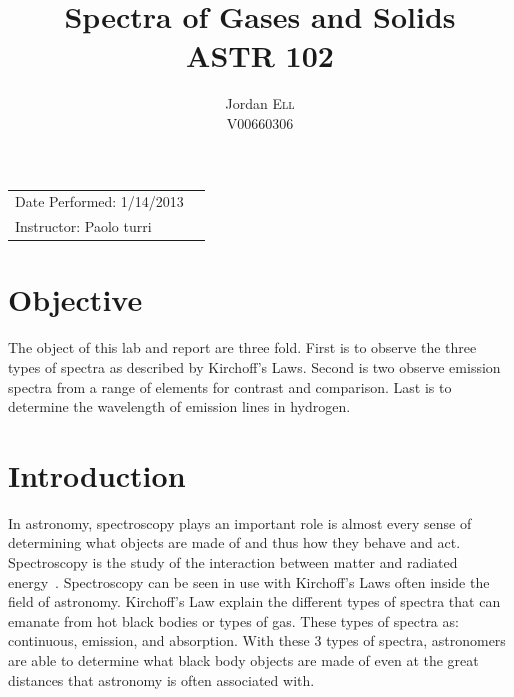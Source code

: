 \documentclass{article}
\title{Spectra of Gases and Solids \\ ASTR 102} %
\author{Jordan \textsc{Ell} \\ V00660306} %
\begin{document}
\maketitle %

\begin{tabular}{lr}
Date Performed: 1/14/2013\\ %
Instructor: Paolo turri %
\end{tabular}

\setlength\parindent{0pt} %

\renewcommand{\labelenumi}{\alph{enumi}.} %


\section{Objective}

The object of this lab and report are three fold. First is to observe the three
types of spectra as described by Kirchoff's Laws. Second is two observe emission 
spectra from a range of elements for contrast and comparison. Last is to determine
the wavelength of emission lines in hydrogen.
 

\section{Introduction}

In astronomy, spectroscopy plays an important role is almost every sense of determining
what objects are made of and thus how they behave and act. Spectroscopy is the
study of the interaction between matter and radiated energy~\cite{Crouch:2007}.
Spectroscopy can be seen in use with Kirchoff's Laws often inside the field of
astronomy. Kirchoff's Law explain the different types of spectra that can emanate from
hot black bodies or types of gas. These types of spectra as: continuous, emission,
and absorption. With these 3 types of spectra, astronomers are able to determine
what black body objects are made of even at the great distances that astronomy is often
associated with.\\
\end{document}

